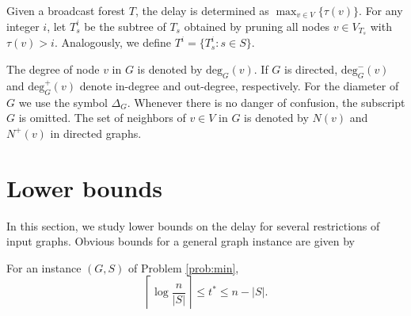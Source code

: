 Given a broadcast forest $T$, the delay is determined as $\max_{v\in V}\{\tau(v)\}$.
For any integer $i$, let $T^i_s$ be the subtree of $T_s$ obtained by pruning all nodes $v\in V_{T_s}$ with $\tau(v)>i$.
Analogously, we define $T^i=\{T^i_s:s\in S\}$. 


The degree of node $v$ in $G$ is denoted by $\text{deg}_G(v)$.
If $G$ is directed, $\text{deg}^-_G(v)$ and $\text{deg}^+_G(v)$ denote in-degree and out-degree, respectively.
For the diameter of $G$ we use the symbol $\Delta_G$.
Whenever there is no danger of confusion, the subscript $G$ is omitted.
The set of neighbors of $v\in V$ in $G$ is denoted by $N(v)$ and $N^+(v)$ in directed graphs.



\section{Lower bounds}
In this section, we study lower bounds on the delay for several restrictions of input graphs.
Obvious bounds for a general graph instance are given by
\begin{observation}
For an instance $(G,S)$ of Problem \ref{prob:min},
$$\left\lceil\log\frac{n}{|S|}\right\rceil\leq t^* \leq n-|S|.$$
\end{observation}

